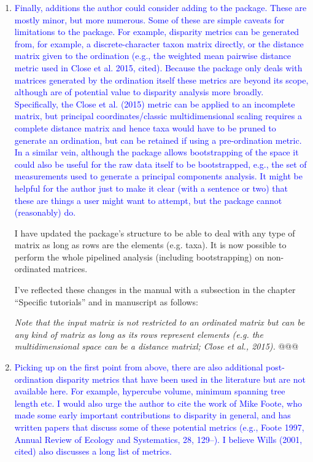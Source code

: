 \documentclass[12pt,letterpaper]{article}
\begin{document}
\begin{enumerate}
\item{\textcolor{blue}{Finally, additions the author could consider adding to the package. These are mostly minor, but more numerous. Some of these are simple caveats for limitations to the package. For example, disparity metrics can be generated from, for example, a discrete-character taxon matrix directly, or the distance matrix given to the ordination (e.g., the weighted mean pairwise distance metric used in Close et al. 2015, cited). Because the package only deals with matrices generated by the ordination itself these metrics are beyond its scope, although are of potential value to disparity analysis more broadly. Specifically, the Close et al. (2015) metric can be applied to an incomplete matrix, but principal coordinates/classic multidimensional scaling requires a complete distance matrix and hence taxa would have to be pruned to generate an ordination, but can be retained if using a pre-ordination metric. In a similar vein, although the package allows bootstrapping of the space it could also be useful for the raw data itself to be bootstrapped, e.g., the set of measurements used to generate a principal components analysis. It might be helpful for the author just to make it clear (with a sentence or two) that these are things a user might want to attempt, but the package cannot (reasonably) do.}}

I have updated the package's structure to be able to deal with any type of matrix as long as rows are the elements (e.g. taxa).
It is now possible to perform the whole pipelined analysis (including bootstrapping) on non-ordinated matrices.

I've reflected these changes in the manual with a subsection in the chapter ``Specific tutorials'' and in manuscript as follows:

\textit{Note that the input matrix is not restricted to an ordinated matrix but can be any kind of matrix as long as its rows represent elements (e.g. the multidimensional space can be a distance matrixl; Close et al., 2015).} @@@


\item{\textcolor{blue}{Picking up on the first point from above, there are also additional post-ordination disparity metrics that have been used in the literature but are not available here. For example, hypercube volume, minimum spanning tree length etc. I would also urge the author to cite the work of Mike Foote, who made some early important contributions to disparity in general, and has written papers that discuss some of these potential metrics (e.g., Foote 1997, Annual Review of Ecology and Systematics, 28, 129–). I believe Wills (2001, cited) also discusses a long list of metrics.}}


\end{enumerate}
\end{document}
